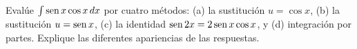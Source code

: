 \item Evalúe $\int \operatorname{sen} x \cos x \, dx$ por cuatro métodos: (a) la sustitución $u = \cos x$, (b) la sustitución $u = \operatorname{sen} x$, (c) la identidad $\operatorname{sen} 2x = 2 \operatorname{sen} x \cos x$, y (d) integración por partes. Explique las diferentes apariencias de las respuestas.
